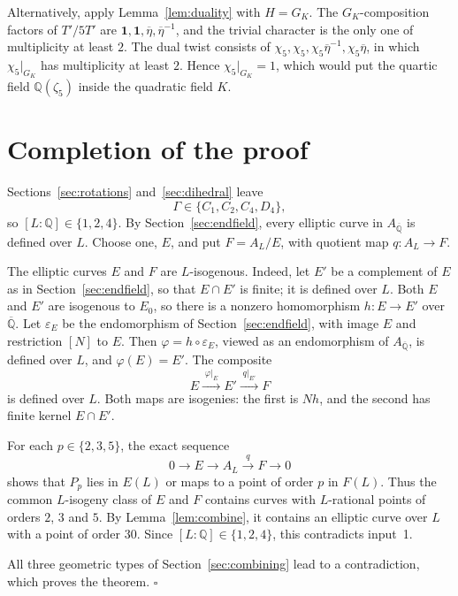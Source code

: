 \documentclass[11pt]{article}
\newcommand{\Q}{\mathbb Q}
\begin{document}
Alternatively, apply Lemma~\ref{lem:duality} with \(H=G_K\). The
\(G_K\)-composition factors of \(T'/5T'\) are
\(\mathbf 1,\mathbf 1,\overline\eta,\overline\eta^{-1}\), and the
trivial character is the only one of multiplicity at least \(2\). The
dual twist consists of
\(\chi_5,\chi_5,\chi_5\overline\eta^{-1},\chi_5\overline\eta\), in
which \(\chi_5|_{G_K}\) has multiplicity at least \(2\). Hence
\(\chi_5|_{G_K}=1\), which would put the quartic field \(\Q(\zeta_5)\)
inside the quadratic field \(K\).

\section{Completion of the proof}\label{sec:completion}

Sections~\ref{sec:rotations} and~\ref{sec:dihedral} leave
\[
 \Gamma\in\{C_1,C_2,C_4,D_4\},
\]
so \([L:\Q]\in\{1,2,4\}\). By Section~\ref{sec:endfield}, every
elliptic curve in \(A_{\overline{\Q}}\) is defined over \(L\). Choose
one, \(E\), and put \(F=A_L/E\), with quotient map \(q:A_L\to F\).

The elliptic curves \(E\) and \(F\) are \(L\)-isogenous. Indeed, let
\(E'\) be a complement of \(E\) as in Section~\ref{sec:endfield}, so
that \(E\cap E'\) is finite; it is defined over \(L\). Both \(E\) and
\(E'\) are isogenous to \(E_0\), so there is a nonzero homomorphism
\(h:E\to E'\) over \(\overline{\Q}\). Let \(\varepsilon_E\) be the
endomorphism of Section~\ref{sec:endfield}, with image \(E\) and
restriction \([N]\) to \(E\). Then \(\varphi=h\circ\varepsilon_E\),
viewed as an endomorphism of \(A_{\overline{\Q}}\), is defined over
\(L\), and \(\varphi(E)=E'\). The composite
\[
 E\xrightarrow{\;\varphi|_E\;}E'\xrightarrow{\;q|_{E'}\;}F
\]
is defined over \(L\). Both maps are isogenies: the first is \(Nh\),
and the second has finite kernel \(E\cap E'\).

For each \(p\in\{2,3,5\}\), the exact sequence
\[
 0\longrightarrow E\longrightarrow A_L\xrightarrow{\;q\;}F
 \longrightarrow0
\]
shows that \(P_p\) lies in \(E(L)\) or maps to a point of order \(p\)
in \(F(L)\). Thus the common \(L\)-isogeny class of \(E\) and \(F\)
contains curves with \(L\)-rational points of orders \(2\), \(3\) and
\(5\). By Lemma~\ref{lem:combine}, it contains an elliptic curve over
\(L\) with a point of order \(30\). Since \([L:\Q]\in\{1,2,4\}\), this
contradicts input~1.

All three geometric types of Section~\ref{sec:combining} lead to a
contradiction, which proves the theorem.
\hfill\(\square\)
\end{document}
